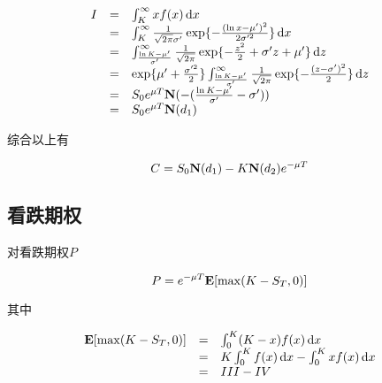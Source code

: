 \begin{equation}
    \begin{array}{rcl}
        I & = & \int_K^\infty xf(x) \,\mathrm{d} x                                                                                                                \\
          & = & \int_{K}^\infty \frac{1}{\sqrt{2\pi}\sigma'}\exp\{-\frac{(\ln x - \mu')^2}{2\sigma'^2}\} \,\mathrm{d} x                                           \\
          & = & \int_{\frac{\ln K - \mu'}{\sigma'}}^\infty \frac{1}{\sqrt{2\pi}} \exp\{-\frac{z^2}{2} + \sigma'z + \mu'\}\,\mathrm{d} z                           \\
          & = & \exp\{\mu'+\frac{\sigma'^2}{2}\} \int_{\frac{\ln K - \mu'}{\sigma'}}^\infty \frac{1}{\sqrt{2\pi}}\exp\{-\frac{(z -\sigma')^2}{2}\} \,\mathrm{d} z \\
          & = & S_0 e^{\mu T} \mathbf{N}(-(\frac{\ln K - \mu'}{\sigma'} - \sigma'))                                                                              \\
          & = & S_0 e^{\mu T} \mathbf{N}(d_1)
    \end{array}
\end{equation}

综合以上有

\begin{equation}
    C = S_0\mathbf{N}(d_1) - K\mathbf{N}(d_2)e^{-\mu T}
\end{equation}

\subsection{看跌期权}

对看跌期权$P$

\begin{equation}
    P = e^{-\mu T}\mathbf{E}[\max (K - S_T,0)]
\end{equation}

其中

\begin{equation}
    \begin{array}{rcl}
        \mathbf{E}[\max (K - S_T, 0)] & = & \int_0^K(K - x)f(x) \,\mathrm{d} x                   \\
                              & = & K\int_0^K f(x) \,\mathrm{d} x - \int_0^K xf(x) \,\mathrm{d} x \\
                              & = & III - IV
    \end{array}
\end{equation}

